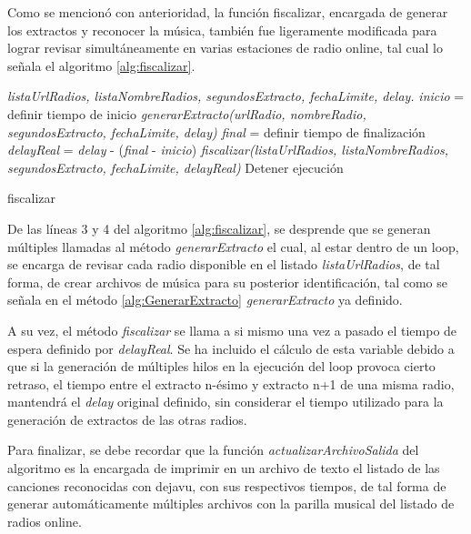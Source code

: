 Como se mencionó con anterioridad, la función fiscalizar, encargada de generar los extractos y reconocer la música, también fue ligeramente modificada para lograr revisar simultáneamente en varias estaciones de radio online, tal cual lo señala el algoritmo \ref{alg:fiscalizar}.

\begin{algorithm}
\begin{algorithmic}[1]
\REQUIRE \textit{listaUrlRadios, listaNombreRadios, segundosExtracto, fechaLimite, delay.}
\STATE \textit{inicio} = definir tiempo de inicio
\STATE \textit{generarExtracto(urlRadio, nombreRadio, segundosExtracto, fechaLimite, delay)}
\ENDFOR
\STATE \textit{final} = definir tiempo de finalización
\STATE \textit{delayReal} = \textit{delay} - (\textit{final} - \textit{inicio})
\STATE \textit{fiscalizar(listaUrlRadios, listaNombreRadios, segundosExtracto, fechaLimite, delayReal)}
\ELSE
\STATE Detener ejecución
\ENDIF

\end{algorithmic}
\caption{fiscalizar}\label{alg:fiscalizar}
\end{algorithm}
 
De las líneas 3 y 4 del algoritmo \ref{alg:fiscalizar}, se desprende que se generan múltiples llamadas al método \textit{generarExtracto} el cual, al estar dentro de un loop, se encarga de revisar cada radio disponible en el listado \textit{listaUrlRadios}, de tal forma, de crear archivos de música para su posterior identificación, tal como se señala en el método \ref{alg:GenerarExtracto} \textit{generarExtracto} ya definido.

A su vez, el método \textit{fiscalizar} se llama a si mismo una vez a pasado el tiempo de espera definido por \textit{delayReal}. Se ha incluido el cálculo de esta variable debido a que si la generación de múltiples hilos en la ejecución del loop provoca cierto retraso, el tiempo entre el extracto n-ésimo y extracto n+1 de una misma radio, mantendrá el \textit{delay} original definido, sin considerar el tiempo utilizado para la generación de extractos de las otras radios.

Para finalizar, se debe recordar que la función \textit{actualizarArchivoSalida} del algoritmo \label{alg:GenerarExtracto} es la encargada de imprimir en un archivo de texto el listado de las canciones reconocidas con dejavu, con sus respectivos tiempos, de tal forma de generar automáticamente múltiples archivos con la parilla musical del listado de radios online.





